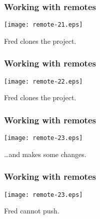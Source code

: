 \documentclass[english]{beamer}
\newcommand{\green}[1]{%
\textcolor{code-green}{#1}%
}
\begin{document}
\begin{frame}[fragile]
\frametitle{Working with remotes}

\texttt{[image: remote-21.eps]}

\begin{center}
Fred \green{clones} the project.
\end{center}

\vspace{\textheight}
\end{frame}

\begin{frame}[fragile]
\frametitle{Working with remotes}

\texttt{[image: remote-22.eps]}

\begin{center}
Fred \green{clones} the project.
\end{center}

\vspace{\textheight}
\end{frame}

\begin{frame}[fragile]
\frametitle{Working with remotes}

\texttt{[image: remote-23.eps]}

\begin{center}
\ldots and makes some changes.
\end{center}

\vspace{\textheight}
\end{frame}

\begin{frame}[fragile]
\frametitle{Working with remotes}

\texttt{[image: remote-23.eps]}

\begin{center}
Fred cannot push.
\end{center}

\vspace{\textheight}
\end{frame}
\end{document}
